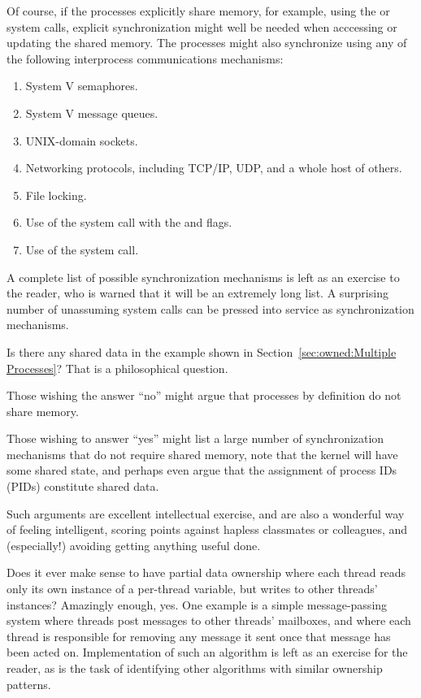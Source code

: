 \begin{enumerate}
	Of course, if the processes explicitly share memory, for
	example, using the  or  system
	calls, explicit synchronization might well be needed when
	acccessing or updating the shared memory.
	The processes might also synchronize using any of the following
	interprocess communications mechanisms:
	\begin{enumerate}
	\item	System V semaphores.
	\item	System V message queues.
	\item	UNIX-domain sockets.
	\item	Networking protocols, including TCP/IP, UDP, and a whole
		host of others.
	\item	File locking.
	\item	Use of the  system call with the
		 and  flags.
	\item	Use of the  system call.
	\end{enumerate}
	A complete list of possible synchronization mechanisms is left
	as an exercise to the reader, who is warned that it will be
	an extremely long list.
	A surprising number of unassuming system calls can be pressed
	into service as synchronization mechanisms.

\QuickQ{}
	Is there any shared data in the example shown in
	Section~\ref{sec:owned:Multiple Processes}?
\QuickA{}
	That is a philosophical question.

	Those wishing the answer ``no'' might argue that processes by
	definition do not share memory.

	Those wishing to answer ``yes'' might list a large number of
	synchronization mechanisms that do not require shared memory,
	note that the kernel will have some shared state, and perhaps
	even argue that the assignment of process IDs (PIDs) constitute
	shared data.

	Such arguments are excellent intellectual exercise, and are
	also a wonderful way of feeling intelligent, scoring points
	against hapless classmates or colleagues,
	and (especially!) avoiding getting anything useful done.

\QuickQ{}
	Does it ever make sense to have partial data ownership where
	each thread reads only its own instance of a per-thread variable,
	but writes to other threads' instances?
\QuickA{}
	Amazingly enough, yes.
	One example is a simple message-passing system where threads post
	messages to other threads' mailboxes, and where each thread
	is responsible for removing any message it sent once that message
	has been acted on.
	Implementation of such an algorithm is left as an exercise for the
	reader, as is the task of identifying other algorithms with
	similar ownership patterns.


\end{enumerate}
